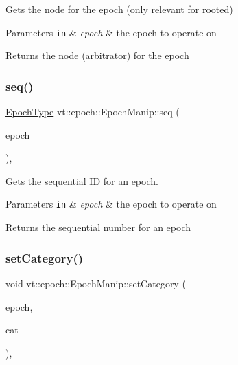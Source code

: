 Gets the node for the epoch (only relevant for rooted) 


\begin{DoxyParams}[1]{Parameters}
\mbox{\tt in}  & {\em epoch} & the epoch to operate on\\
\hline
\end{DoxyParams}
\begin{DoxyReturn}{Returns}
the node (arbitrator) for the {\ttfamily epoch} 
\end{DoxyReturn}
\mbox{\label{structvt_1_1epoch_1_1_epoch_manip_ac34685702f19dde2f5bc25fcb43ec038}} 
\subsubsection{\texorpdfstring{seq()}{seq()}}
{\footnotesize\ttfamily \hyperlink{namespacevt_a985a5adf291c34a3ca263b3378388236}{Epoch\+Type} vt\+::epoch\+::\+Epoch\+Manip\+::seq (\begin{DoxyParamCaption}\item[{\hyperlink{namespacevt_a985a5adf291c34a3ca263b3378388236}{Epoch\+Type} const \&}]{epoch }\end{DoxyParamCaption})\hspace{0.3cm}{\ttfamily [inline]}, {\ttfamily [static]}}



Gets the sequential ID for an epoch. 


\begin{DoxyParams}[1]{Parameters}
\mbox{\tt in}  & {\em epoch} & the epoch to operate on\\
\hline
\end{DoxyParams}
\begin{DoxyReturn}{Returns}
the sequential number for an {\ttfamily epoch} 
\end{DoxyReturn}
\mbox{\label{structvt_1_1epoch_1_1_epoch_manip_a5ef6f747225cf046cff1fb39945fa547}} 
\subsubsection{\texorpdfstring{set\+Category()}{setCategory()}}
{\footnotesize\ttfamily void vt\+::epoch\+::\+Epoch\+Manip\+::set\+Category (\begin{DoxyParamCaption}\item[{\hyperlink{namespacevt_a985a5adf291c34a3ca263b3378388236}{Epoch\+Type} \&}]{epoch,  }\item[{\hyperlink{namespacevt_1_1epoch_a956abe0aceef0d10a988de8acb002c7c}{e\+Epoch\+Category} const}]{cat }\end{DoxyParamCaption})\hspace{0.3cm}{\ttfamily [inline]}, {\ttfamily [static]}}



